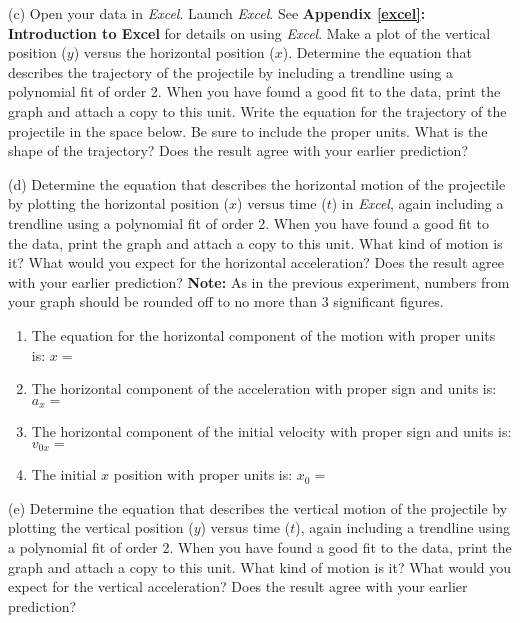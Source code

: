 (c) Open your data in \textit{Excel}.
Launch \textit{Excel}. 
See \textbf{Appendix \ref{excel}: Introduction to Excel} for details on using
\textit{Excel}. Make a plot of the vertical position ($y$) versus the
horizontal position ($x$). Determine the equation that describes the trajectory
of the projectile by including a trendline using a polynomial fit of order 2. 
 When you have found a good fit to the data, print the graph
and attach a copy to this unit. Write the equation for the trajectory of the
projectile in the space below. Be sure to include the proper units. What is the shape of the trajectory? Does the result agree with your earlier prediction?
\vspace{20mm}

(d) Determine the equation that describes the horizontal motion of the projectile by plotting the horizontal position ($x$) versus time ($t$) in
\textit{Excel}, again including a trendline using a polynomial fit of order 2. 
When you have
found a good fit to the data, print the graph and attach a copy to this unit.
What kind of motion is it? What would you expect for the horizontal acceleration? Does the result agree with your earlier prediction?
\textbf{Note:} As in the previous experiment, numbers from your graph should be rounded off to no more than 3 significant figures.
\vspace{8mm}

\begin{enumerate}
\item The equation for the horizontal component of the motion with proper units is:
$x =$\vspace{5mm}

\item The horizontal component of the acceleration with proper sign and units is:
\( a_{x}= \) \vspace{5mm}

\item The horizontal component of the initial velocity with proper sign and units
is: \( v_{0x}= \)\vspace{5mm}

\item The initial $x$ position with proper units is: \( x_{0}= \)\vspace{5mm}

\end{enumerate}
(e) Determine the equation that describes the vertical motion of the projectile
by plotting the vertical position ($y$) versus time ($t$), again including a trendline using a polynomial fit of order 2.  When you have found a good fit to the data, print the graph and attach
a copy to this unit. What kind of motion is it? What would you expect for the vertical acceleration? Does the result agree with your earlier prediction?
\vspace{15mm}

